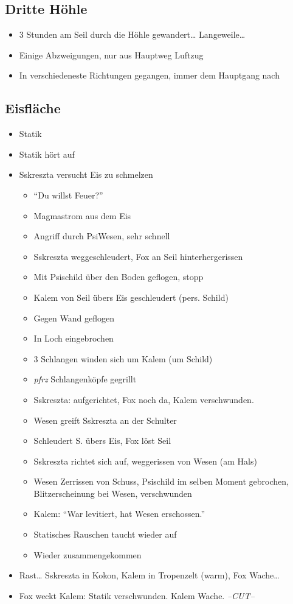 \documentclass[11pt]{article}
\begin{document}
\subsection{Dritte Höhle}

\begin{itemize}
\item
  3 Stunden am Seil durch die Höhle gewandert\ldots{} Langeweile\ldots{}
\item
  Einige Abzweigungen, nur aus Hauptweg Luftzug
\item
  In verschiedeneste Richtungen gegangen, immer dem Hauptgang nach
\end{itemize}
\subsection{Eisfläche}

\begin{itemize}
\item
  Statik
\item
  Statik hört auf
\item
  Sskreszta versucht Eis zu schmelzen

  \begin{itemize}
  \item
    ``Du willst Feuer?''
  \item
    Magmastrom aus dem Eis
  \item
    Angriff durch PsiWesen, sehr schnell
  \item
    Sskreszta weggeschleudert, Fox an Seil hinterhergerissen
  \item
    Mit Psischild über den Boden geflogen, stopp
  \item
    Kalem von Seil übers Eis geschleudert (pers. Schild)
  \item
    Gegen Wand geflogen
  \item
    In Loch eingebrochen
  \item
    3 Schlangen winden sich um Kalem (um Schild)
  \item
    \emph{pfrz} Schlangenköpfe gegrillt
  \item
    Sskreszta: aufgerichtet, Fox noch da, Kalem verschwunden.
  \item
    Wesen greift Sskreszta an der Schulter
  \item
    Schleudert S. übers Eis, Fox löst Seil
  \item
    Sskreszta richtet sich auf, weggerissen von Wesen (am Hals)
  \item
    Wesen Zerrissen von Schuss, Psischild im selben Moment gebrochen,
    Blitzerscheinung bei Wesen, verschwunden
  \item
    Kalem: ``War levitiert, hat Wesen erschossen.''
  \item
    Statisches Rauschen taucht wieder auf
  \item
    Wieder zusammengekommen
  \end{itemize}
\item
  Rast\ldots{} Sskreszta in Kokon, Kalem in Tropenzelt (warm), Fox
  Wache\ldots{}
\item
  Fox weckt Kalem: Statik verschwunden. Kalem Wache. \emph{--CUT--}
\end{itemize}
\end{document}
